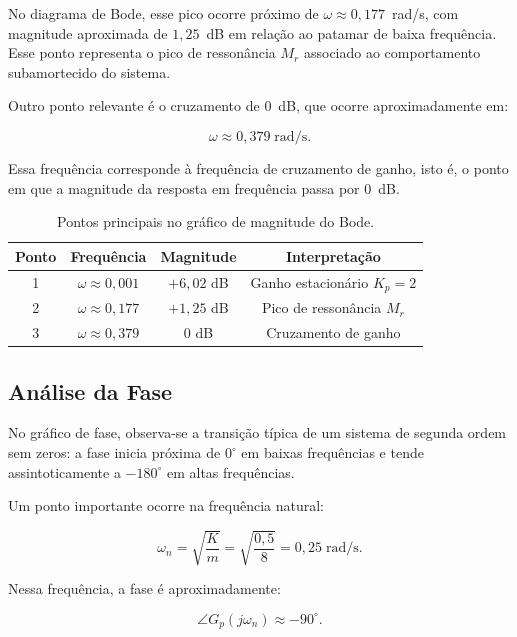 \documentclass[12pt,a4paper]{article}
\begin{document}
No diagrama de Bode, esse pico ocorre próximo de $\omega\approx0{,}177$~rad/s, com magnitude aproximada de $1{,}25$~dB em relação ao patamar de baixa frequência. Esse ponto representa o pico de ressonância $M_r$ associado ao comportamento subamortecido do sistema.

Outro ponto relevante é o cruzamento de $0$~dB, que ocorre aproximadamente em:

\begin{equation}
  \omega\approx0{,}379\;\text{rad/s}.
\end{equation}

Essa frequência corresponde à frequência de cruzamento de ganho, isto é, o ponto em que a magnitude da resposta em frequência passa por $0$~dB.

\begin{table}[H]
  \centering
  \caption{Pontos principais no gráfico de magnitude do Bode.}
  \label{tab:q8_magnitude}
  \begin{tabular}{cccc}
    \toprule
    \textbf{Ponto} & \textbf{Frequência} & \textbf{Magnitude} & \textbf{Interpretação} \\
    \midrule
    1 & $\omega\approx0{,}001$ & $+6{,}02$ dB & Ganho estacionário $K_p=2$ \\
    2 & $\omega\approx0{,}177$ & $+1{,}25$ dB & Pico de ressonância $M_r$ \\
    3 & $\omega\approx0{,}379$ & $0$ dB & Cruzamento de ganho \\
    \bottomrule
  \end{tabular}
\end{table}

\subsection{Análise da Fase}

No gráfico de fase, observa-se a transição típica de um sistema de segunda ordem sem zeros: a fase inicia próxima de $0^\circ$ em baixas frequências e tende assintoticamente a $-180^\circ$ em altas frequências.

Um ponto importante ocorre na frequência natural:

\begin{equation}
  \omega_n=\sqrt{\frac{K}{m}}=\sqrt{\frac{0{,}5}{8}}=0{,}25\;\text{rad/s}.
\end{equation}

Nessa frequência, a fase é aproximadamente:

\begin{equation}
  \angle G_p(j\omega_n)\approx-90^\circ.
\end{equation}
\end{document}
